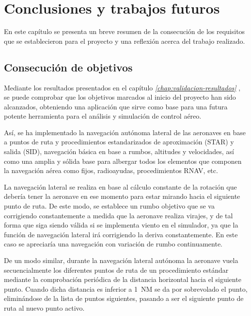 \chapter{Conclusiones y trabajos futuros}
\label{chap:conclusiones-trabajos-futuros}

En este capítulo se presenta un breve resumen de la consecución de los requisitos que se establecieron para el proyecto y una reflexión acerca del trabajo realizado.


\section{Consecución de objetivos}
\label{sec:consecucion-objetivos}

Mediante los resultados presentados en el capítulo \textit{\ref{chap:validacion-resultados} }, se puede comprobar que los objetivos marcados al inicio del proyecto han sido alcanzados, obteniendo una aplicación que sirve como base para una futura potente herramienta para el análisis y simulación de control aéreo.

Así, se ha implementado la navegación autónoma lateral de las aeronaves en base a puntos de ruta y procedimientos estandarizados de aproximación (STAR) y salida (SID), navegación básica en base a rumbos, altitudes y velocidades, así como una amplia y sólida base para albergar todos los elementos que componen la navegación aérea como fijos, radioayudas, procedimientos RNAV, etc.

La navegación lateral se realiza en base al cálculo constante de la rotación que debería tener la aeronave en ese momento para estar mirando hacia el siguiente punto de ruta. De este modo, se establece un rumbo objetivo que se va corrigiendo constantemente a medida que la aeronave realiza virajes, y de tal forma que siga siendo válida si se implementa viento en el simulador, ya que la función de navegación lateral irá corrigiendo la deriva constantemente. En este caso se apreciaría una navegación con variación de rumbo continuamente.

De un modo similar, durante la navegación lateral autónoma la aeronave vuela secuencialmente los diferentes puntos de ruta de un procedimiento estándar mediante la comprobación periódica de la distancia horizontal hacia el siguiente punto. Cuando dicha distancia es inferior a \SI{1}{NM} se da por sobrevolado el punto, eliminándose de la lista de puntos siguientes, pasando a ser el siguiente punto de ruta al nuevo punto activo.

